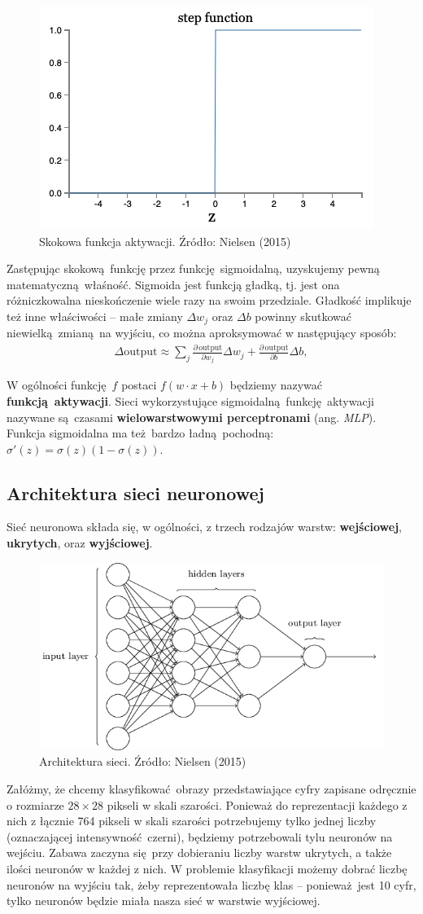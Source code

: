 \documentclass[10pt, oneside]{article}
\theoremstyle{remark}
\begin{document}
\begin{figure}[htpb]
	\centering
	\includegraphics[width=.4\linewidth]{figures/step}
	\caption{Skokowa funkcja aktywacji. Źródło: Nielsen (2015)}
	\label{fig:step}
\end{figure}

Zastępując skokową funkcję przez funkcję sigmoidalną, uzyskujemy pewną matematyczną właśność.
Sigmoida jest funkcją gładką, tj. jest ona różniczkowalna nieskończenie wiele razy na swoim przedziale.
Gładkość implikuje też inne właściwości -- małe zmiany $\Delta w_j$ oraz $\Delta b$ powinny skutkować niewielką zmianą na wyjściu, co można aproksymować w następujący sposób:
\begin{eqnarray} 
  \Delta \mbox{output} \approx \sum_j \frac{\partial \, \mbox{output}}{\partial w_j}
  \Delta w_j + \frac{\partial \, \mbox{output}}{\partial b} \Delta b,
\end{eqnarray}

W ogólności funkcję $f$ postaci $f(w \cdot x + b)$ będziemy nazywać \textbf{funkcją aktywacji}.
Sieci wykorzystujące sigmoidalną funkcję aktywacji nazywane są czasami \textbf{wielowarstwowymi perceptronami} (ang. \emph{MLP}).
Funkcja sigmoidalna ma też bardzo ładną pochodną: $\sigma'(z) = \sigma(z)(1-\sigma(z))$.


\subsection{Architektura sieci neuronowej}
Sieć neuronowa składa się, w ogólności, z trzech rodzajów warstw: \textbf{wejściowej}, \textbf{ukrytych}, oraz \textbf{wyjściowej}.
\begin{figure}[htpb]
	\centering
	\includegraphics[width=.5\linewidth]{figures/tikz11}
	\caption{Architektura sieci. Źródło: Nielsen (2015)}
\end{figure}
Załóżmy, że chcemy klasyfikować obrazy przedstawiające cyfry zapisane odręcznie o rozmiarze $28 \times 28$ pikseli w skali szarości.
Ponieważ do reprezentacji każdego z nich z łącznie 764 pikseli w skali szarości potrzebujemy tylko jednej liczby (oznaczającej intensywność czerni), będziemy potrzebowali tylu neuronów na wejściu.
Zabawa zaczyna się przy dobieraniu liczby warstw ukrytych, a także ilości neuronów w każdej z nich.
W problemie klasyfikacji możemy dobrać liczbę neuronów na wyjściu tak, żeby reprezentowała liczbę klas -- ponieważ jest 10 cyfr, tylko neuronów będzie miała nasza sieć w warstwie wyjściowej.
\end{document}
